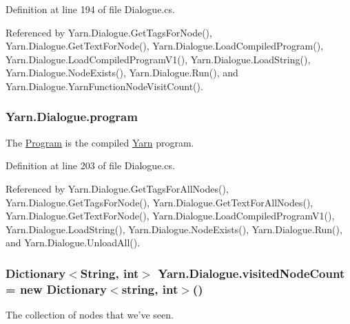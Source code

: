 Definition at line 194 of file Dialogue.\-cs.



Referenced by Yarn.\-Dialogue.\-Get\-Tags\-For\-Node(), Yarn.\-Dialogue.\-Get\-Text\-For\-Node(), Yarn.\-Dialogue.\-Load\-Compiled\-Program(), Yarn.\-Dialogue.\-Load\-Compiled\-Program\-V1(), Yarn.\-Dialogue.\-Load\-String(), Yarn.\-Dialogue.\-Node\-Exists(), Yarn.\-Dialogue.\-Run(), and Yarn.\-Dialogue.\-Yarn\-Function\-Node\-Visit\-Count().

\hypertarget{a00094_a0a1cca92325f430425d784d416cb5c2b}{
\subsubsection[{program}]{ Yarn.\-Dialogue.\-program\hspace{0.3cm}{\ttfamily [package]}}}\label{a00094_a0a1cca92325f430425d784d416cb5c2b}


The \hyperlink{a00154}{Program} is the compiled \hyperlink{a00053}{Yarn} program. 



Definition at line 203 of file Dialogue.\-cs.



Referenced by Yarn.\-Dialogue.\-Get\-Tags\-For\-All\-Nodes(), Yarn.\-Dialogue.\-Get\-Tags\-For\-Node(), Yarn.\-Dialogue.\-Get\-Text\-For\-All\-Nodes(), Yarn.\-Dialogue.\-Get\-Text\-For\-Node(), Yarn.\-Dialogue.\-Load\-Compiled\-Program\-V1(), Yarn.\-Dialogue.\-Load\-String(), Yarn.\-Dialogue.\-Node\-Exists(), Yarn.\-Dialogue.\-Run(), and Yarn.\-Dialogue.\-Unload\-All().

\hypertarget{a00094_aae9e64354066a1e2fa130629959d772b}{
\subsubsection[{visited\-Node\-Count}]{\setlength{\rightskip}{0pt plus 5cm}Dictionary$<${\bf String}, int$>$ Yarn.\-Dialogue.\-visited\-Node\-Count = new Dictionary$<$string, int$>$()}}\label{a00094_aae9e64354066a1e2fa130629959d772b}


The collection of nodes that we've seen. 



